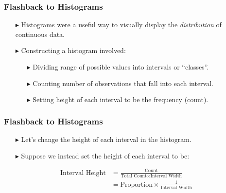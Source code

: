 \documentclass[12pt]{beamer}
\begin{document}
 \begin{frame}
 	\frametitle{Flashback to Histograms}
 	
 	\begin{itemize}
 		\item[\color{blue}$\blacktriangleright$] Histograms were a useful way to visually display the \emph{distribution} of continuous data.
 		\item[\color{blue}$\blacktriangleright$] Constructing a histogram involved:
 		\begin{itemize}
 			\item[\color{blue}$\blacktriangleright$]Dividing range of possible values into intervals or ``classes''.
 			\item[\color{blue}$\blacktriangleright$] Counting number of observations that fall into each interval.
 			\item[\color{blue}$\blacktriangleright$] Setting height of each interval to be the frequency (count).
 		\end{itemize}
 	\end{itemize}
 	
 \end{frame}
 
 \begin{frame}
 	\frametitle{Flashback to Histograms}
 	
 	\begin{itemize}
 		\item[\color{blue}$\blacktriangleright$] Let's change the height of each interval in the histogram.
 		\item[\color{blue}$\blacktriangleright$] Suppose we instead set the height of each interval to be:
 	\end{itemize}
 	
 	\vspace{0.5cm}
 	
 	\begin{align*}
 		\text{Interval Height} &= \frac{\text{Count}}{\text{Total Count} \times \text{Interval Width}} \\[1em]
 		&= \text{Proportion} \times \frac{1}{\text{Interval Width}}
 	\end{align*}
 	
 \end{frame}
 
\end{document}
